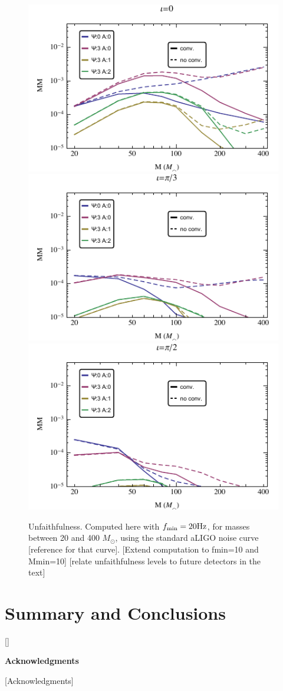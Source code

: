 \documentclass[aps,showpacs,twocolumn,
prd,superscriptaddress,nofootinbib]{revtex4-1}
\newcommand{\Msol}{M_{\odot}}
\newcommand{\SM}[1]{{\color{Red} #1}}
\begin{document}
\begin{figure}
  \includegraphics[width=.32\linewidth]{plots/mismatches_--_inc0.pdf}
  \hspace{0.1cm}
  \includegraphics[width=.32\linewidth]{plots/mismatches_--_incpi3.pdf}
  \hspace{0.1cm}
  \includegraphics[width=.32\linewidth]{plots/mismatches_--_incpi2.pdf}
  \caption{Unfaithfulness. Computed here with $f_{\rm min} = 20\mathrm{Hz}$, for masses between 20 and 400 $\Msol$, using the standard aLIGO noise curve \SM{[reference for that curve]}. \SM{[Extend computation to fmin=10 and Mmin=10]} \SM{[relate unfaithfulness levels to future detectors in the text]} }
  \label{fig:precunfaithfulness}
\end{figure}


\section{Summary and Conclusions}
\label{sec:discussion}

[]


\vspace{4.5mm}

\hspace{0.85in}
{\bf Acknowledgments}

\vspace{3.5mm}

[Acknowledgments]
\end{document}
